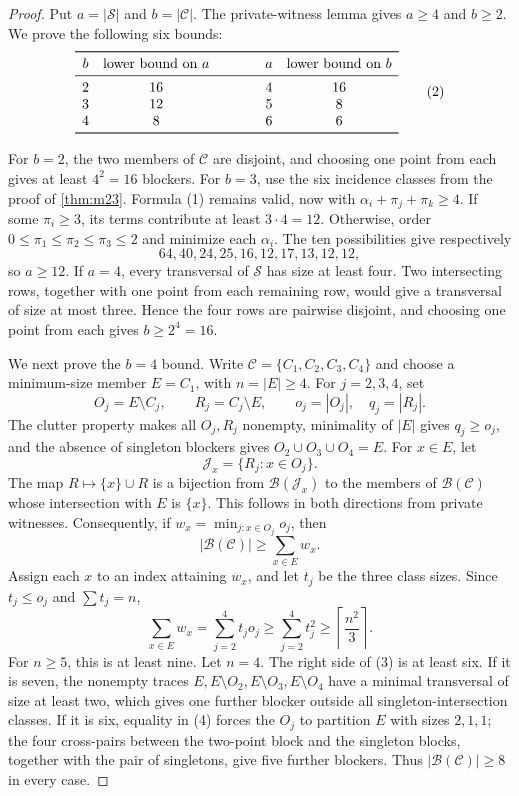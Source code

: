 \documentclass[11pt]{article}
\theoremstyle{definition}
\theoremstyle{remark}
\newcommand{\blocker}{\mathcal{B}}
\begin{document}
\begin{proof}
Put $a=|\mathcal S|$ and $b=|\mathcal C|$.  The private-witness lemma gives
$a\geq4$ and $b\geq2$.  We prove the following six bounds:
\[
\begin{array}{cc@{\qquad\qquad}cc}
\toprule
b&\text{lower bound on }a&a&\text{lower bound on }b\\
\midrule
2&16&4&16\\
3&12&5&8\\
4&8&6&6\\
\bottomrule
\end{array}
\tag{2}
\]

For $b=2$, the two members of $\mathcal C$ are disjoint, and choosing one
point from each gives at least $4^2=16$ blockers.  For $b=3$, use the six
incidence classes from the proof of \cref{thm:m23}.  Formula (1) remains
valid, now with
$\alpha_i+\pi_j+\pi_k\geq4$.  If some $\pi_i\geq3$, its terms contribute at
least $3\cdot4=12$.  Otherwise, order
$0\leq\pi_1\leq\pi_2\leq\pi_3\leq2$ and minimize each $\alpha_i$.
The ten possibilities give respectively
\[
  64,40,24,25,16,12,17,13,12,12,
\]
so $a\geq12$.  If $a=4$, every transversal of $\mathcal S$ has size at least
four.  Two intersecting rows, together with one point from each remaining
row, would give a transversal of size at most three.  Hence the four rows are
pairwise disjoint, and choosing one point from each gives $b\geq2^4=16$.

We next prove the $b=4$ bound.  Write
$\mathcal C=\{C_1,C_2,C_3,C_4\}$ and choose a minimum-size member
$E=C_1$, with $n=|E|\geq4$.  For $j=2,3,4$, set
\[
  O_j=E\setminus C_j,\qquad R_j=C_j\setminus E,\qquad
  o_j=|O_j|,\quad q_j=|R_j|.
\]
The clutter property makes all $O_j,R_j$ nonempty, minimality of $|E|$ gives
$q_j\geq o_j$, and the absence of singleton blockers gives
$O_2\cup O_3\cup O_4=E$.  For $x\in E$, let
\[
  \mathcal J_x=\{R_j:x\in O_j\}.
\]
The map $R\mapsto\{x\}\cup R$ is a bijection from
$\blocker(\mathcal J_x)$ to the members of $\blocker(\mathcal C)$ whose
intersection with $E$ is $\{x\}$.  This follows in both directions from
private witnesses.  Consequently, if
$w_x=\min_{j:x\in O_j}o_j$, then
\[
  |\blocker(\mathcal C)|\geq\sum_{x\in E}w_x.
\tag{3}
\]
Assign each $x$ to an index attaining $w_x$, and let $t_j$ be the three
class sizes.  Since $t_j\leq o_j$ and $\sum t_j=n$,
\[
  \sum_{x\in E}w_x=\sum_{j=2}^4t_j o_j
  \geq\sum_{j=2}^4t_j^2
  \geq\left\lceil\frac{n^2}{3}\right\rceil.
\tag{4}
\]
For $n\geq5$, this is at least nine.  Let $n=4$.  The right side of (3) is
at least six.  If it is seven, the nonempty traces
$E,E\setminus O_2,E\setminus O_3,E\setminus O_4$ have a minimal
transversal of size at least two, which gives one further blocker outside all
singleton-intersection classes.  If it is six, equality in (4) forces the
$O_j$ to partition $E$ with sizes $2,1,1$; the four cross-pairs between the
two-point block and the singleton blocks, together with the pair of
singletons, give five further blockers.  Thus
$|\blocker(\mathcal C)|\geq8$ in every case.


\end{proof}
\end{document}
